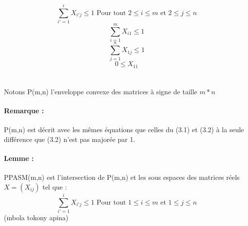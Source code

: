\documentclass{book}
\begin{document}
\begin{equation}
\sum_{i'=1}^{i} X_{i'j}  \leqslant 1 \text{ Pour tout } 2 \leqslant i \leqslant m \text{ et } 2 \leqslant j \leqslant n
\end{equation}
\begin{equation}
\sum_{i=1}^{m} X_{i1}  \leqslant 1 
\end{equation}
\begin{equation}
\sum_{j=1}^{n} X_{1j}  \leqslant 1 
\end{equation}
\begin{equation}
0   \leqslant X_{11} 
\end{equation}
\\\\
Notons P(m,n) l'enveloppe convexe des matrices à signe de taille $m*n$ \\\\
\textbf{Remarque : }\\\\
P(m,n) est décrit avec les mêmes équations que celles du (3.1) et (3.2) à la seule différence que (3.2) n'est pas majorée par 1. \\\\
\textbf{Lemme : }\\\\
PPASM(m,n) est l'intersection de P(m,n) et les sous espaces des matrices réels $X=(X_{ij})$ tel que : \\
\begin{equation}
\sum_{i'=1}^{i} X_{i'j}  \leqslant 1 \text{ Pour tout } 1 \leqslant i \leqslant m \text{ et } 1 \leqslant j \leqslant n
\end{equation}
(mbola tokony apina)
\end{document}
